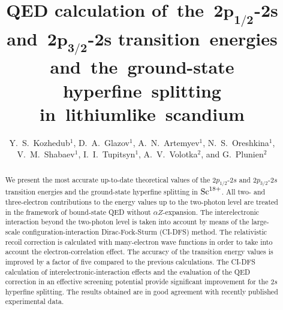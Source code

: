 \documentclass[preprint,aps,pra,showpacs,floatfix]{revtex4}
\newcommand{\aZ}{\alpha Z}
\begin{document}
\title{
QED calculation of~the~$\bm{2p_{1/2}}$-$\bm{2s}$ and~$\bm{2p_{3/2}}$-$\bm{2s}$
transition~energies and~the~ground-state hyperfine~splitting in~lithiumlike~scandium}
%
%
\author{Y.~S.~Kozhedub$^1$, D.~A.~Glazov$^1$, A.~N.~Artemyev$^1$, N.~S.~Oreshkina$^1$,
V.~M.~Shabaev$^1$, I.~I.~Tupitsyn$^1$,  A.~V.~Volotka$^2$, and G.~Plunien$^2$}
%
%
\begin{abstract}
%
We present the most accurate up-to-date theoretical values of the ${2p_{1/2}}$-${2s}$
and ${2p_{3/2}}$-${2s}$ transition energies and the ground-state hyperfine
splitting in ${\rm Sc}^{18+}$. All two- and three-electron contributions
to the energy values up to the two-photon level are treated in the framework
of bound-state QED without $\aZ$-expansion. The interelectronic interaction
beyond the two-photon level is taken into account by means of the large-scale
configuration-interaction Dirac-Fock-Sturm (CI-DFS) method. The relativistic
recoil correction is calculated with many-electron wave functions in order
to take into account the electron-correlation effect. The accuracy of
the transition energy values is improved by a factor of five compared
to the previous calculations. The CI-DFS calculation of interelectronic-interaction
effects and the evaluation of the QED correction in an effective screening
potential provide significant improvement for the $2s$ hyperfine splitting.
The results obtained are in good agreement with recently published
experimental data.
%
\end{abstract}
%
%
\maketitle
%
%
%
\end{document}
